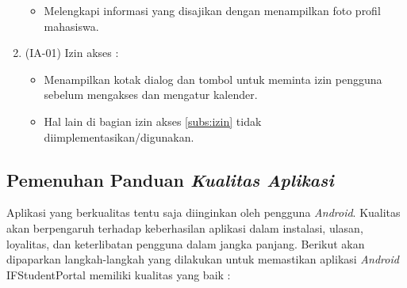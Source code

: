 \begin{enumerate}
    \begin{itemize}
        \item Melengkapi informasi yang disajikan dengan menampilkan foto profil mahasiswa.
        \end{itemize}
    \item (IA-01) Izin akses : 
    \begin{itemize}
        \item Menampilkan kotak dialog dan tombol untuk meminta izin pengguna sebelum mengakses dan mengatur kalender.
        \item Hal lain di bagian izin akses \ref{subs:izin} tidak diimplementasikan/digunakan.
        \end{itemize}
\end{enumerate}

\subsection{Pemenuhan Panduan \textit{Kualitas Aplikasi}}
Aplikasi yang berkualitas tentu saja diinginkan oleh pengguna \textit{Android}. Kualitas akan berpengaruh terhadap keberhasilan aplikasi dalam instalasi, ulasan, loyalitas, dan keterlibatan pengguna  dalam jangka panjang. Berikut akan dipaparkan langkah-langkah yang dilakukan untuk memastikan aplikasi \textit{Android} IFStudentPortal memiliki kualitas yang baik :


